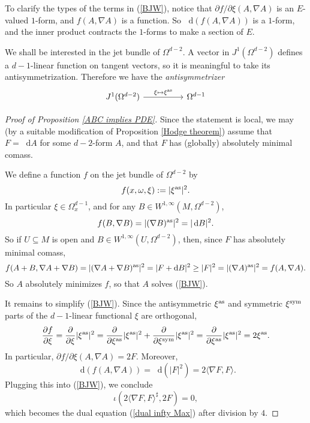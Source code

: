 \documentclass[reqno,11pt]{amsart}
\newcommand*\dif{\mathop{}\!\mathrm{d}}
\newcommand{\dfn}[1]{\emph{#1}\index{#1}}
\theoremstyle{definition}
\numberwithin{equation}{section}
\begin{document}
To clarify the types of the terms in (\ref{BJW}), notice that $\partial f/\partial \xi(A, \nabla A)$ is an $E$-valued $1$-form, and $f(A, \nabla A)$ is a function.
So $\dif(f(A, \nabla A))$ is a $1$-form, and the inner product contracts the $1$-forms to make a section of $E$.

We shall be interested in the jet bundle of $\Omega^{d - 2}$.
A vector in $J^1(\Omega^{d - 2})$ defines a $d - 1$-linear function on tangent vectors, so it is meaningful to take its antisymmetrization.
Therefore we have the \dfn{antisymmetrizer}
\[\begin{tikzcd}
	{J^1(\Omega^{d - 2})} && {\Omega^{d - 1}}
	\arrow["{\xi \mapsto \xi^{\rm as}}", from=1-1, to=1-3]
\end{tikzcd}\]

\begin{proof}[Proof of Proposition \ref{ABC implies PDE}]
Since the statement is local, we may (by a suitable modification of Proposition \ref{Hodge theorem}) assume that $F = \dif A$ for some $d - 2$-form $A$, and that $F$ has (globally) absolutely minimal comass.

We define a function $f$ on the jet bundle of $\Omega^{d - 2}$ by 
$$f(x, \omega, \xi) := |\xi^{\rm as}|^2.$$
In particular $\xi \in \Omega^{d - 1}_x$, and for any $B \in W^{1, \infty}(M, \Omega^{d - 2})$,
$$f(B, \nabla B) = |(\nabla B)^{\rm as}|^2 = |\dif B|^2.$$
So if $U \subseteq M$ is open and $B \in W^{1, \infty}(U, \Omega^{d - 2})$, then, since $F$ has absolutely minimal comass,
$$f(A + B, \nabla A + \nabla B) = |(\nabla A + \nabla B)^{\rm as}|^2 = |F + \dif B|^2 \geq |F|^2 = |(\nabla A)^{\rm as}|^2 = f(A, \nabla A).$$
So $A$ absolutely minimizes $f$, so that $A$ solves (\ref{BJW}).

It remains to simplify (\ref{BJW}).
Since the antisymmetric $\xi^{\rm as}$ and symmetric $\xi^{\rm sym}$ parts of the $d - 1$-linear functional $\xi$ are orthogonal,
$$\frac{\partial f}{\partial \xi} = \frac{\partial}{\partial \xi} |\xi^{\rm as}|^2 = \frac{\partial}{\partial \xi^{\rm as}} |\xi^{\rm as}|^2 + \frac{\partial}{\partial \xi^{\rm sym}} |\xi^{\rm as}|^2 = \frac{\partial}{\partial \xi^{\rm as}} |\xi^{\rm as}|^2 = 2\xi^{\rm as}.$$
In particular, $\partial f/\partial \xi(A, \nabla A) = 2F$.
Moreover, 
$$\dif(f(A, \nabla A)) = \dif(|F|^2) = 2\langle \nabla F, F\rangle.$$
Plugging this into (\ref{BJW}), we conclude 
$$\iota(2\langle \nabla F, F\rangle^\sharp, 2F) = 0,$$
which becomes the dual equation (\ref{dual infty Max}) after division by $4$.
\end{proof}
\end{document}
